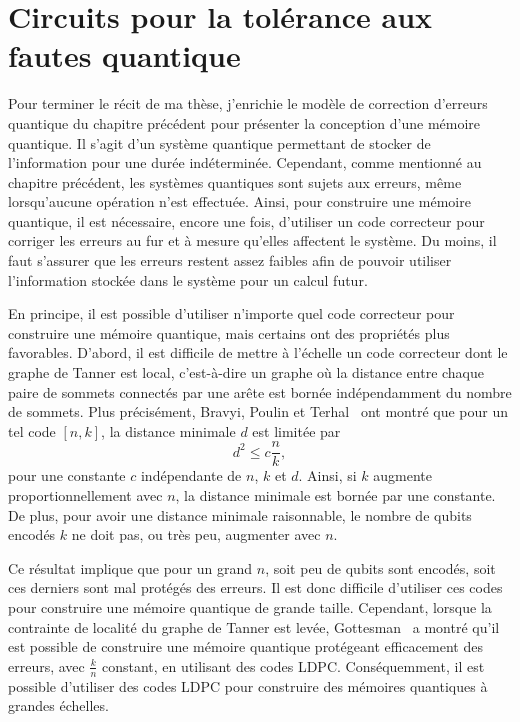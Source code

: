 \begin{comment}
\end{comment}

\chapter{Circuits pour la tolérance aux fautes quantique}

Pour terminer le récit de ma thèse,
j'enrichie le modèle de correction d'erreurs quantique
du chapitre précédent pour présenter la conception d'une mémoire quantique.
Il s'agit d'un système quantique permettant de stocker
de l'information pour une durée indéterminée.
Cependant,
comme mentionné au chapitre précédent,
les systèmes quantiques sont sujets aux erreurs,
même lorsqu'aucune opération n'est effectuée.
Ainsi,
pour construire une mémoire quantique,
il est nécessaire, encore une fois,
d'utiliser un code correcteur pour corriger les erreurs au fur et à mesure
qu'elles affectent le système.
Du moins,
il faut s'assurer que les erreurs restent assez faibles afin de pouvoir utiliser
l'information stockée dans le système pour un calcul futur.

En principe,
il est possible d'utiliser n'importe quel code correcteur pour construire
une mémoire quantique,
mais certains ont des propriétés plus favorables.
D'abord,
il est difficile de mettre à l'échelle un code correcteur dont le graphe
de Tanner est local, c'est-à-dire un graphe où la distance entre chaque paire de sommets 
connectés par une arête est bornée indépendamment du nombre de sommets.
Plus précisément,
Bravyi, Poulin et Terhal~\cite{bravyi_tradeoffs_2010}
ont montré que pour un tel code $[n, k]$,
la distance minimale $d$ est limitée par
\begin{equation}
	d^2 \leq c \frac{n}{k},
\end{equation}
pour une constante $c$ indépendante de $n$, $k$ et $d$.
Ainsi,
si $k$ augmente proportionnellement avec $n$,
la distance minimale est bornée par une constante.
De plus,
pour avoir une distance minimale raisonnable,
le nombre de qubits encodés $k$ 
ne doit pas, ou très peu, augmenter avec $n$.

Ce résultat implique que pour un grand $n$,
soit peu de qubits sont encodés,
soit ces derniers sont mal protégés des erreurs.
Il est donc difficile d'utiliser ces codes pour construire une mémoire 
quantique de grande taille.
Cependant,
lorsque la contrainte de localité du graphe de Tanner est levée,
Gottesman~\cite{gottesman_fault-tolerant_2013} a montré qu'il est possible 
de construire une mémoire quantique protégeant efficacement des erreurs,
avec $\frac{k}{n}$ constant, en utilisant des codes LDPC.
Conséquemment,
il est possible d'utiliser des codes LDPC pour construire 
des mémoires quantiques à grandes échelles.

